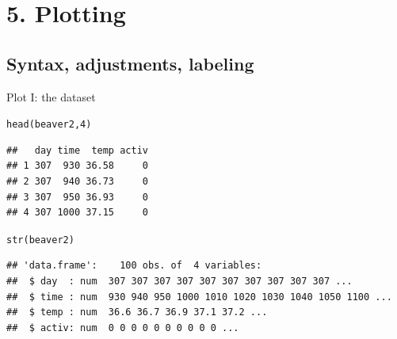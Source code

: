 \documentclass[xcolor=table,           xcolor=dvipsnames]{beamer}\usepackage[]{graphicx}\usepackage[]{color}
\makeatletter
\newcommand{\hlnum}[1]{\textcolor[rgb]{0,0,0}{#1}}
\newcommand{\hlcom}[1]{\textcolor[rgb]{0,0.392,0}{\textit{#1}}}
\newcommand{\hlopt}[1]{\textcolor[rgb]{0,0,0}{#1}}
\newcommand{\hlstd}[1]{\textcolor[rgb]{0,0,0}{#1}}
\newcommand{\hlkwd}[1]{\textcolor[rgb]{0,0,1}{#1}}
\newenvironment{kframe}{%
 \def\at@end@of@kframe{}%
 \ifinner\ifhmode%
  \def\at@end@of@kframe{\end{minipage}}%
  \begin{minipage}{\columnwidth}%
 \fi\fi%
 \def\FrameCommand##1{\hskip\@totalleftmargin \hskip-\fboxsep
 \colorbox{shadecolor}{##1}\hskip-\fboxsep
     \hskip-\linewidth \hskip-\@totalleftmargin \hskip\columnwidth}%
 \MakeFramed {\advance\hsize-\width
   \@totalleftmargin\z@ \linewidth\hsize
   \@setminipage}}%
 {\par\unskip\endMakeFramed%
 \at@end@of@kframe}
\newenvironment{knitrout}{}{} %
\newcommand{\rcode}[1]{\texttt{\textcolor{Blue}{#1}}} %
\makeatother
\begin{document}
\section{5. Plotting}

\subsection{Syntax, adjustments, labeling}

\begin{frame}[fragile]{Plot I: the dataset}
\begin{knitrout}\footnotesize
{}\color{fgcolor}\begin{kframe}
\begin{alltt}
\hlkwd{head}\hlstd{(beaver2,} \hlnum{4}\hlstd{)}
\end{alltt}
\begin{verbatim}
##   day time  temp activ
## 1 307  930 36.58     0
## 2 307  940 36.73     0
## 3 307  950 36.93     0
## 4 307 1000 37.15     0
\end{verbatim}
\begin{alltt}
\hlkwd{str}\hlstd{(beaver2)}
\end{alltt}
\begin{verbatim}
## 'data.frame':	100 obs. of  4 variables:
##  $ day  : num  307 307 307 307 307 307 307 307 307 307 ...
##  $ time : num  930 940 950 1000 1010 1020 1030 1040 1050 1100 ...
##  $ temp : num  36.6 36.7 36.9 37.1 37.2 ...
##  $ activ: num  0 0 0 0 0 0 0 0 0 0 ...
\end{verbatim}
\end{kframe}
\end{knitrout}
\end{frame}


\end{document}
